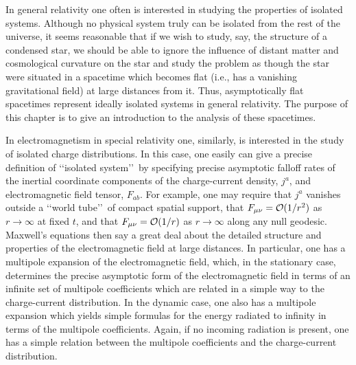 
In general relativity one often is interested in studying the properties of isolated
systems. Although no physical system truly can be isolated from the rest of the
universe, it seems reasonable that if we wish to study, say, the structure of a
condensed star, we should be able to ignore the influence of distant matter and
cosmological curvature on the star and study the problem as though the star were
situated in a spacetime which becomes flat (i.e., has a vanishing gravitational field)
at large distances from it. Thus, asymptotically flat spacetimes represent ideally
isolated systems in general relativity. The purpose of this chapter is to give an
introduction to the analysis of these spacetimes.

In electromagnetism in special relativity one, similarly, is interested in the study
of isolated charge distributions. In this case, one easily can give a precise definition
of \lq\lq isolated system\rq\rq\ by specifying precise asymptotic falloff rates of the inertial
coordinate components of the charge-current density, \(j^a\), and electromagnetic field
tensor, \(F_{ab}\). For example, one may require that \(j^a\) vanishes outside a \lq\lq world
tube\rq\rq\ of compact spatial support, that \(F_{\mu\nu}=\mathcal{O}(1/r^2)\) as \(r\to\infty\)
at fixed \(t\), and that \(F_{\mu\nu}=\mathcal{O}(1/r)\) as \(r\to\infty\) along any null
geodesic. Maxwell's equations then say a great deal about the detailed structure and
properties of the electromagnetic field at large distances. In particular, one has a
multipole expansion of the electromagnetic field, which, in the stationary case,
determines the precise asymptotic form of the electromagnetic field in terms of an
infinite set of multipole coefficients which are related in a simple way to the
charge-current distribution. In the dynamic case, one also has a multipole expansion
which yields simple formulas for the energy radiated to infinity in terms of the
multipole coefficients. Again, if no incoming radiation is present, one has a simple
relation between the multipole coefficients and the charge-current distribution.

